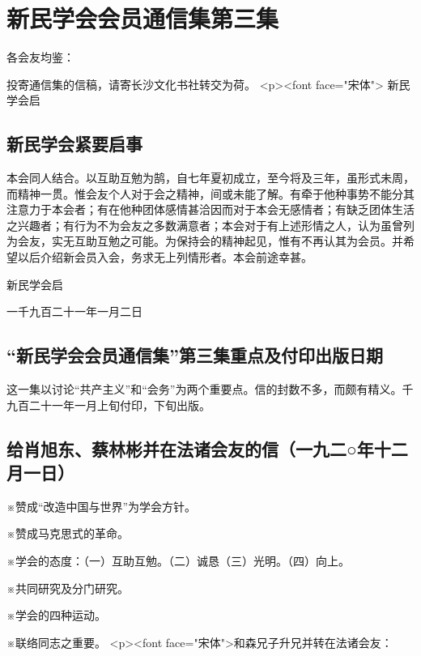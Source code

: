 \section{新民学会会员通信集第三集}



各会友均鉴：

投寄通信集的信稿，请寄长沙文化书社转交为荷。
<p><font face="宋体"> 
新民学会启
\subsection{新民学会紧要启事}

本会同人结合。以互助互勉为鹄，自七年夏初成立，至今将及三年，虽形式未周，而精神一贯。惟会友个人对于会之精神，间或未能了解。有牵于他种事势不能分其注意力于本会者；有在他种团体感情甚洽因而对于本会无感情者；有缺乏团体生活之兴趣者；有行为不为会友之多数满意者；本会对于有上述形情之人，认为虽曾列为会友，实无互助互勉之可能。为保持会的精神起见，惟有不再认其为会员。并希望以后介绍新会员入会，务求无上列情形者。本会前途幸甚。


新民学会启

一千九百二十一年一月二日
\subsection{“新民学会会员通信集”第三集重点及付印出版日期}

这一集以讨论“共产主义”和“会务”为两个重要点。信的封数不多，而颇有精义。千九百二十一年一月上旬付印，下旬出版。
\subsection{给肖旭东、蔡林彬并在法诸会友的信（一九二○年十二月一日）}

※赞成“改造中国与世界”为学会方针。

※赞成马克思式的革命。

※学会的态度：（一）互助互勉。（二）诚恳（三）光明。（四）向上。

※共同研究及分门研究。

※学会的四种运动。

※联络同志之重要。
<p><font face="宋体">和森兄子升兄并转在法诸会友：


